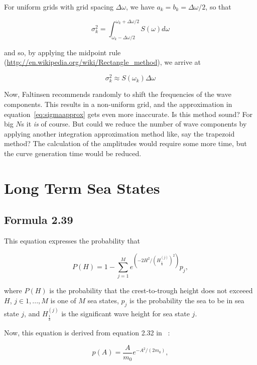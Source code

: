 \documentclass{article}
\newcommand{\Hs}{H_{\frac{1}{3}}}
\newcommand{\Hsj}{\Hs^{(j)}}
\begin{document}
For uniform grids with grid spacing $\Delta\omega$, we have $a_k = b_k =
\Delta\omega/2$, so that

\begin{equation}
  \sigma_k^2 = \int_{\omega_k - \Delta\omega/2}^{\omega_k + \Delta\omega/2}S(\omega)d\omega
\end{equation}

and so, by applying the midpoint rule
(\url{http://en.wikipedia.org/wiki/Rectangle_method}), we arrive at

\begin{equation}
  \label{eq:sigmaapprox}
  \sigma_k^2 \approx S(\omega_k)\Delta\omega
\end{equation}

Now, Faltinsen recommends randomly to shift the frequencies of the
wave components. This results in a non-uniform grid, and the
approximation in equation~\ref{eq:sigmaapprox} gets even more
inaccurate. Is this method sound? For big $N$s it \emph{is} of course. But
could we reduce the number of wave components by applying another
integration approximation method like, say the trapezoid method? The
calculation of the amplitudes would require some more time, but the
curve generation time would be reduced.

\section{Long Term Sea States}

\subsection{Formula 2.39}

This equation expresses the probability that

\begin{equation}
  \label{eq:2.39}
  P(H) = 1 - \sum\limits_{j = 1}^M e^{(-2H^2/(\Hsj)^2)} p_j,
\end{equation}

\noindent
where $P(H)$ is the probability that the crest-to-trough height does
not exceeed $H$, $j \in {1, ..., M}$ is one of $M$ sea states, $p_j$
is the probability the sea to be in sea state $j$, and $\Hsj$ is the
significant wave height for sea state $j$.

Now, this equation is derived from equation 2.32 in ~\cite{faltinsen90}:

\begin{equation}
  \label{eq:2.32}
  p(A) = \frac{A}{m_0} e^{-A^2/(2m_0)},
\end{equation}
\end{document}
